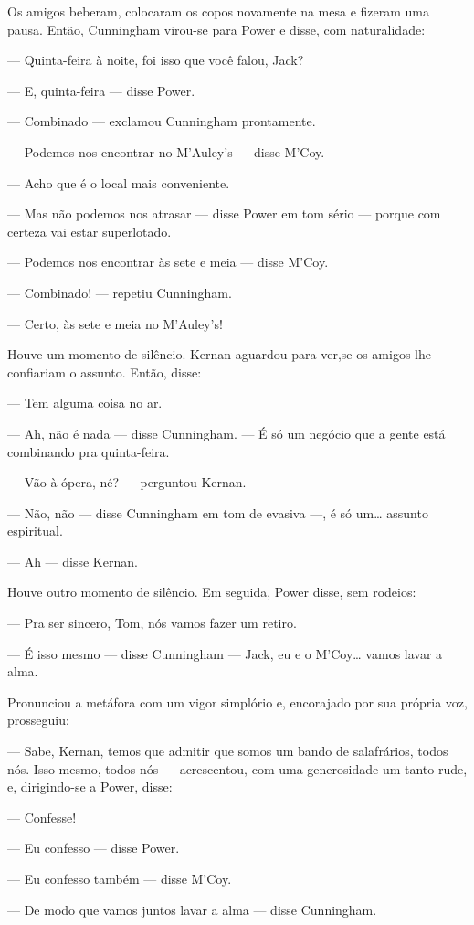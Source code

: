 Os amigos beberam, colocaram os copos novamente na mesa e fizeram uma
pausa. Então, Cunningham virou-se para Power e disse, com
naturalidade:

--- Quinta-feira à noite, foi isso que você falou, Jack?

--- E, quinta-feira --- disse Power.

--- Combinado --- exclamou Cunningham prontamente.

--- Podemos nos encontrar no M'Auley's --- disse M'Coy.

--- Acho que é o local mais conveniente.

--- Mas não podemos nos atrasar --- disse Power em tom sério
--- porque com certeza vai estar superlotado.

--- Podemos nos encontrar às sete e meia --- disse M'Coy.

--- Combinado! --- repetiu Cunningham.

--- Certo, às sete e meia no M'Auley's!

Houve um momento de silêncio. Kernan aguardou para ver,se os amigos
lhe confiariam o assunto. Então, disse:

--- Tem alguma coisa no ar.

--- Ah, não é nada --- disse Cunningham. --- É só um negócio que a
gente está combinando pra quinta-feira.

--- Vão à ópera, né? --- perguntou Kernan.

--- Não, não --- disse Cunningham em tom de evasiva ---, é só um\ldots{}
assunto espiritual.

--- Ah --- disse Kernan.

Houve outro momento de silêncio. Em seguida, Power disse, sem rodeios:

--- Pra ser sincero, Tom, nós vamos fazer um retiro.

--- É isso mesmo --- disse Cunningham --- Jack, eu e o M'Coy\ldots{} vamos
lavar a alma.

Pronunciou a metáfora com um vigor simplório e, encorajado por sua
própria voz, prosseguiu:

--- Sabe, Kernan, temos que admitir que somos um bando de salafrários,
todos nós. Isso mesmo, todos nós --- acrescentou, com uma generosidade
um tanto rude, e, dirigindo-se a Power, disse:

--- Confesse!

--- Eu confesso --- disse Power.

--- Eu confesso também --- disse M'Coy.

--- De modo que vamos juntos lavar a alma --- disse Cunningham.

